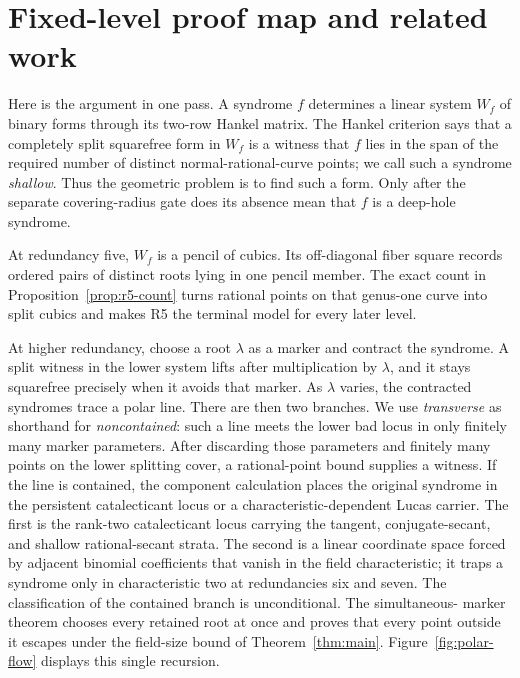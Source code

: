 \section{Fixed-level proof map and related work}\label{sec:overview}

Here is the argument in one pass.  A syndrome \(f\) determines a linear
system \(W_f\) of binary forms through its two-row Hankel matrix.  The
Hankel criterion says that a completely split squarefree form in \(W_f\)
is a witness that \(f\) lies in the span of the required number of distinct
normal-rational-curve points; we call such a syndrome \emph{shallow}.  Thus
the geometric problem is to find such a form.  Only after the separate
covering-radius gate does its absence mean that \(f\) is a deep-hole
syndrome.

At redundancy five, \(W_f\) is a pencil of cubics.  Its off-diagonal fiber
square records ordered pairs of distinct roots lying in one pencil member.
The exact count in Proposition~\ref{prop:r5-count} turns rational
points on that genus-one curve into split cubics and makes R5 the terminal
model for every later level.

At higher redundancy, choose a root \(\lambda\) as a marker and contract the
syndrome.  A split witness in the lower system lifts after multiplication by
\(\lambda\), and it stays squarefree precisely when it avoids that marker.
As \(\lambda\) varies, the contracted syndromes trace a polar line.  There
are then two branches.  We use \emph{transverse} as shorthand for
\emph{noncontained}: such a line meets the lower bad locus in only finitely
many marker parameters.  After discarding those parameters and finitely many
points on the lower splitting cover, a rational-point bound supplies a
witness.  If the line is contained, the component calculation places the
original syndrome in the persistent catalecticant locus or a
characteristic-dependent Lucas carrier.  The first is the rank-two
catalecticant locus carrying the tangent, conjugate-secant, and shallow
rational-secant strata.  The second is a linear coordinate space forced by
adjacent binomial coefficients that vanish in the field characteristic; it
traps a syndrome only in characteristic two at redundancies six and seven.
The classification of the contained branch is unconditional.  The simultaneous-
marker theorem chooses every retained root at once and proves that every point
outside it escapes under the field-size bound of Theorem~\ref{thm:main}.
Figure~\ref{fig:polar-flow} displays this single recursion.

